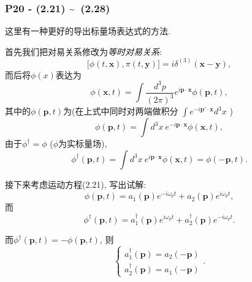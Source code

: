 \documentclass[cn,hazy,green,11pt,device=normal,chinesefont=founder]{elegantnote}
\begin{document}
\subsubsection{P20 - (2.21) \textasciitilde \ (2.28)} \label{subsubsec:KG_Field_expression}

这里有一种更好的导出标量场表达式的方法. 

首先我们把对易关系修改为\textit{等时对易关系}: 
\begin{equation}
  \bigl[\phi(t, \mathbf{x}), \pi(t, \mathbf{y})\bigr] = i\delta^{(3)}(\mathbf{x} - \mathbf{y}), 
\end{equation}
而后将$\phi(x)$表达为
\begin{equation}
  \phi(\mathbf{x}, t) = \int \frac{d^3 p}{(2\pi)^3}e^{i\mathbf{p \cdot x}}\phi(\mathbf{p}, t), 
\end{equation}
其中的$\phi(\mathbf{p}, t)$为(在上式中同时对两端做积分 $\int e^{-i\mathbf{p'\cdot x}} d^3 x$ )
\begin{equation}
  \phi(\mathbf{p}, t) = \int d^3 x\ e^{-i\mathbf{p \cdot x}}\phi(\mathbf{x}, t), 
\end{equation}
由于$\phi^\dagger = \phi$ ($\phi$为实标量场), 
\begin{equation}
  \phi^{\dagger}(\mathbf{p}, t) = \int d^3 x\ e^{i\mathbf{p \cdot x}}\phi(\mathbf{x}, t) = \phi(-\mathbf{p}, t). 
\end{equation}

接下来考虑运动方程(2.21), 写出试解: 
\begin{equation}
  \phi(\mathbf{p}, t) = a_1(\mathbf{p})e^{-i\omega_p t} + a_2(\mathbf{p})e^{i\omega_p t}, 
\end{equation}
而
\begin{equation}
  \phi^{\dagger}(\mathbf{p}, t) = a_1^{\dagger}(\mathbf{p})e^{i\omega_p t} + a_2^{\dagger}(\mathbf{p})e^{-i\omega_p t}. 
\end{equation}

而$\phi^{\dagger}(\mathbf{p}, t) = -\phi(\mathbf{p}, t)$, 则
\begin{equation}
  \left\{\begin{array}{c} a_1^{\dagger}(\mathbf{p}) = a_2(\mathbf{-p})\\ a_2^{\dagger}(\mathbf{p}) = a_1(\mathbf{-p})\end{array}\right..
\end{equation}
\end{document}
